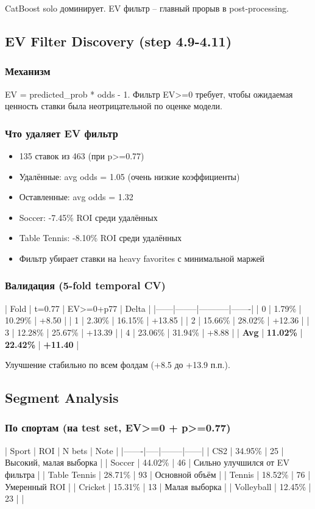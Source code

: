 \documentclass[12pt,a4paper]{article}
\begin{document}
CatBoost solo доминирует. EV фильтр -- главный прорыв в post-processing.

\subsection{EV Filter Discovery (step 4.9-4.11)}
\subsubsection{Механизм}
EV = predicted\_prob * odds - 1. Фильтр EV>=0 требует, чтобы ожидаемая ценность ставки была неотрицательной по оценке модели.

\subsubsection{Что удаляет EV фильтр}
\begin{itemize}
  \item 135 ставок из 463 (при p>=0.77)
  \item Удалённые: avg odds = 1.05 (очень низкие коэффициенты)
  \item Оставленные: avg odds = 1.32
  \item Soccer: -7.45\% ROI среди удалённых
  \item Table Tennis: -8.10\% ROI среди удалённых
  \item Фильтр убирает ставки на heavy favorites с минимальной маржей
\end{itemize}

\subsubsection{Валидация (5-fold temporal CV)}
| Fold | t=0.77 | EV>=0+p77 | Delta |
|------|--------|-----------|-------|
| 0 | 1.79\% | 10.29\% | +8.50 |
| 1 | 2.30\% | 16.15\% | +13.85 |
| 2 | 15.66\% | 28.02\% | +12.36 |
| 3 | 12.28\% | 25.67\% | +13.39 |
| 4 | 23.06\% | 31.94\% | +8.88 |
| \textbf{Avg} | \textbf{11.02\%} | \textbf{22.42\%} | \textbf{+11.40} |

Улучшение стабильно по всем фолдам (+8.5 до +13.9 п.п.).

\subsection{Segment Analysis}
\subsubsection{По спортам (на test set, EV>=0 + p>=0.77)}
| Sport | ROI | N bets | Note |
|-------|-----|--------|------|
| CS2 | 34.95\% | 25 | Высокий, малая выборка |
| Soccer | 44.02\% | 46 | Сильно улучшился от EV фильтра |
| Table Tennis | 28.71\% | 93 | Основной объём |
| Tennis | 18.52\% | 76 | Умеренный ROI |
| Cricket | 15.31\% | 13 | Малая выборка |
| Volleyball | 12.45\% | 23 | |
\end{document}
